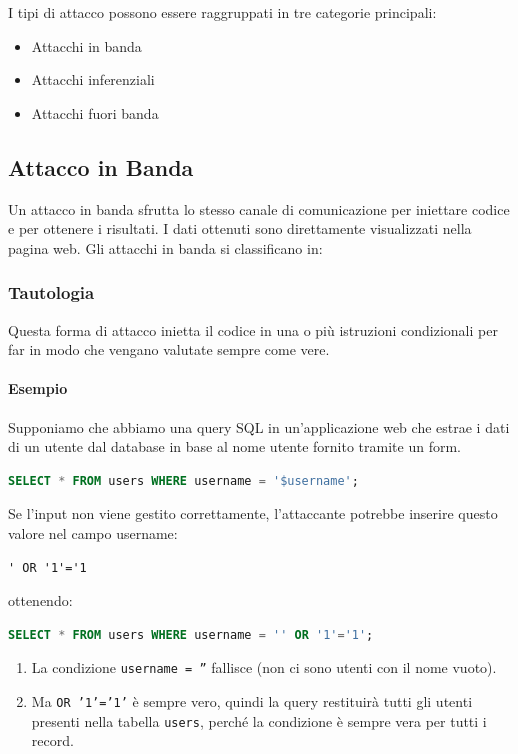 I tipi di attacco possono essere raggruppati in tre categorie principali:

\begin{itemize}
    \item Attacchi in banda
    \item Attacchi inferenziali
    \item Attacchi fuori banda
\end{itemize}

\subsection{Attacco in Banda}

Un attacco in banda sfrutta lo stesso canale di comunicazione per iniettare codice e per ottenere i risultati. I dati ottenuti sono direttamente visualizzati nella pagina web. Gli attacchi in banda si classificano in:

\subsubsection{Tautologia}

Questa forma di attacco inietta il codice in una o più istruzioni condizionali per far in modo che vengano valutate sempre come vere.

\paragraph{Esempio} Supponiamo che abbiamo una query SQL in un'applicazione web che estrae i dati di un utente dal database in base al nome utente fornito tramite un form.

\begin{lstlisting}[language=SQL]
SELECT * FROM users WHERE username = '$username';
\end{lstlisting}

Se l'input non viene gestito correttamente, l'attaccante potrebbe inserire questo valore nel campo username:

\begin{verbatim}
' OR '1'='1
\end{verbatim}

ottenendo:

\begin{lstlisting}[language=SQL]
SELECT * FROM users WHERE username = '' OR '1'='1';
\end{lstlisting}

\begin{enumerate}
    \item La condizione \texttt{username = ''} fallisce (non ci sono utenti con il nome vuoto).
    \item Ma \texttt{OR '1'='1'} è sempre vero, quindi la query restituirà tutti gli utenti presenti nella tabella \texttt{users}, perché la condizione è sempre vera per tutti i record.
\end{enumerate}

